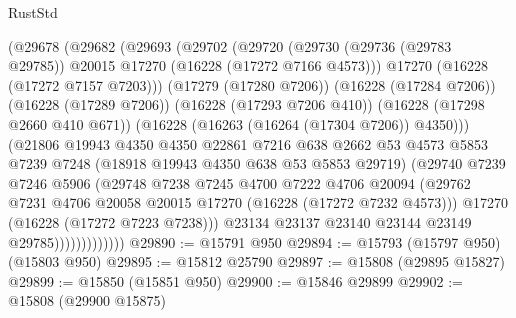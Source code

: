 \begin{lexlean}{RustStd}
\begin{coremodule}
                    (@29678
                      (@29682
                        (@29693
                          (@29702
                            (@29720
                              (@29730
                                (@29736 (@29783 @29785))
                                @20015
                                @17270
                                (@16228 (@17272 @7166 @4573)))
                              @17270
                              (@16228 (@17272 @7157 @7203)))
                            (@17279 (@17280 @7206))
                            (@16228 (@17284 @7206))
                            (@16228 (@17289 @7206))
                            (@16228 (@17293 @7206 @410))
                            (@16228 (@17298 @2660 @410 @671))
                            (@16228 (@16263 (@16264 (@17304 @7206)) @4350)))
                          (@21806
                            @19943
                            @4350
                            @4350
                            @22861
                            @7216
                            @638
                            @2662
                            @53
                            @4573
                            @5853
                            @7239
                            @7248
                            (@18918 @19943 @4350 @638 @53 @5853 @29719)
                            (@29740
                              @7239
                              @7246
                              @5906
                              (@29748
                                @7238
                                @7245
                                @4700
                                @7222
                                @4706
                                @20094
                                (@29762
                                  @7231
                                  @4706
                                  @20058
                                  @20015
                                  @17270
                                  (@16228 (@17272 @7232 @4573)))
                                @17270
                                (@16228 (@17272 @7223 @7238)))
                              @23134
                              @23137
                              @23140
                              @23144
                              @23149
                              @29785)))))))))))))
@29890 := @15791 @950
@29894 := @15793 (@15797 @950) (@15803 @950)
@29895 := @15812 @25790
@29897 := @15808 (@29895 @15827)
@29899 := @15850 (@15851 @950)
@29900 := @15846 @29899
@29902 := @15808 (@29900 @15875)

\end{coremodule}
\end{lexlean}
